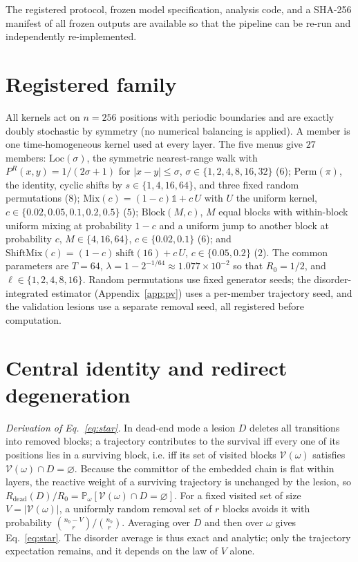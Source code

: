 \documentclass[aps,pre,twocolumn,superscriptaddress,floatfix,longbibliography]{revtex4-2}
\begin{document}
\begin{acknowledgments}
The registered protocol, frozen model specification, analysis code, and a SHA-256
manifest of all frozen outputs are available so that the pipeline can be
re-run and independently re-implemented.
\end{acknowledgments}

\appendix

\section{Registered family}
\label{app:family}

All kernels act on $n=256$ positions with periodic boundaries and are exactly
doubly stochastic by symmetry (no numerical balancing is applied). A member is one
time-homogeneous kernel used at every layer. The five menus give $27$ members:
$\mathrm{Loc}(\sigma)$, the symmetric nearest-range walk with $P^R(x,y)=1/(2\sigma+1)$
for $|x-y|\le\sigma$, $\sigma\in\{1,2,4,8,16,32\}$ ($6$); $\mathrm{Perm}(\pi)$, the
identity, cyclic shifts by $s\in\{1,4,16,64\}$, and three fixed random permutations
($8$); $\mathrm{Mix}(c)=(1-c)\mathbb{1}+c\,U$ with $U$ the uniform kernel,
$c\in\{0.02,0.05,0.1,0.2,0.5\}$ ($5$); $\mathrm{Block}(M,c)$, $M$ equal blocks with
within-block uniform mixing at probability $1-c$ and a uniform jump to another block
at probability $c$, $M\in\{4,16,64\}$, $c\in\{0.02,0.1\}$ ($6$); and
$\mathrm{ShiftMix}(c)=(1-c)\,\mathrm{shift}(16)+c\,U$, $c\in\{0.05,0.2\}$ ($2$). The
common parameters are $T=64$, $\lambda=1-2^{-1/64}\approx1.077\times10^{-2}$ so that
$R_0=1/2$, and $\ell\in\{1,2,4,8,16\}$. Random permutations use fixed generator
seeds; the disorder-integrated estimator (Appendix~\ref{app:pv}) uses a
per-member trajectory seed, and the validation lesions use a separate removal seed,
all registered before computation.

\section{Central identity and redirect degeneration}
\label{app:identity}

\emph{Derivation of Eq.~\eqref{eq:star}.} In dead-end mode a lesion $D$ deletes all
transitions into removed blocks; a trajectory contributes to the survival iff every
one of its positions lies in a surviving block, i.e. iff its set of visited blocks
$\mathcal{V}(\omega)$ satisfies $\mathcal{V}(\omega)\cap D=\varnothing$. Because the
committor of the embedded chain is flat within layers, the reactive weight of a
surviving trajectory is unchanged by the lesion, so
$R_{\mathrm{dead}}(D)/R_0=\mathbb{P}_\omega[\mathcal{V}(\omega)\cap D=\varnothing]$.
For a fixed visited set of size $V=|\mathcal{V}(\omega)|$, a uniformly random removal
set of $r$ blocks avoids it with probability
$\binom{n_b-V}{r}\big/\binom{n_b}{r}$. Averaging over $D$ and then over $\omega$
gives Eq.~\eqref{eq:star}. The disorder average is thus exact and analytic; only the
trajectory expectation remains, and it depends on the law of $V$ alone.
\end{document}
